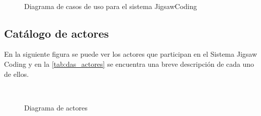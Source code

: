 \begin{figure}[!h]
  \centering
  \\
  \caption[Casos de uso]{Diagrama de casos de uso para el sistema JigsawCoding}
  \label{fig:casos_de_uso}
\end{figure}


\subsection{Catálogo de actores}
En la siguiente figura se puede ver los actores que participan en el Sistema Jigsaw Coding y en la \autoref{tab:das_actores} se encuentra una breve descripción de cada uno de ellos.

\begin{figure}[h!]
	\centering
	\\
	\caption[Diagrama de actores]{Diagrama de actores}
	\label{fig:das_actores}
\end{figure}

